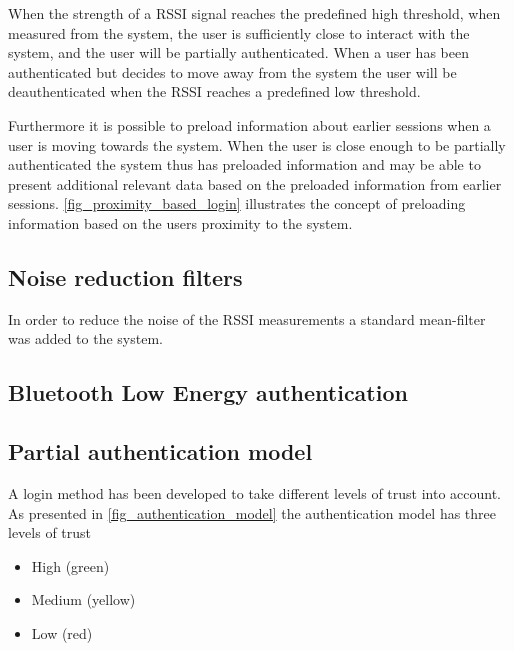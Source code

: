 
When the strength of a RSSI signal reaches the predefined high threshold, when measured from the system, the user is sufficiently close to interact with the system, and the user will be partially authenticated.
When a user has been authenticated but decides to move away from the system the user will be deauthenticated when the RSSI reaches a predefined low threshold.

Furthermore it is possible to preload information about earlier sessions when a user is moving towards the system.
When the user is close enough to be partially authenticated the system thus has preloaded information and may be able to present additional relevant data based on the preloaded information from earlier sessions. 
\cref{fig_proximity_based_login} illustrates the concept of preloading information based on the users proximity to the system.

\subsection{Noise reduction filters}
In order to reduce the noise of the RSSI measurements a standard mean-filter was added to the system.

\subsection{Bluetooth Low Energy authentication}

\subsection{Partial authentication model}
A login method has been developed to take different levels of trust into account.
As presented in \cref{fig_authentication_model} the authentication model has three levels of trust
\begin{itemize}
\item High (green)
\item Medium (yellow)
\item Low (red)
\end{itemize}


